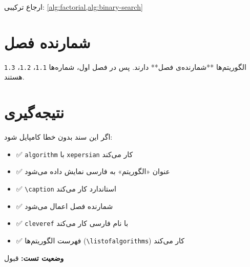 ارجاع ترکیبی: \cref{alg:factorial,alg:binary-search}

\section{شمارنده فصل}
\label{sec:chapter-counter}

الگوریتم‌ها **شمارنده‌ی فصل** دارند. پس در فصل اول، شماره‌ها \texttt{1.1}، \texttt{1.2}، \texttt{1.3} هستند.

\section{نتیجه‌گیری}
\label{sec:conclusion}

اگر این سند بدون خطا کامپایل شود:

\begin{itemize}
    \item ✅ \texttt{algorithm} با \texttt{xepersian} کار می‌کند
    \item ✅ عنوان «الگوریتم» به فارسی نمایش داده می‌شود
    \item ✅ \texttt{\textbackslash caption} استاندارد کار می‌کند
    \item ✅ شمارنده فصل اعمال می‌شود
    \item ✅ \texttt{cleveref} با نام فارسی کار می‌کند
    \item ✅ فهرست الگوریتم‌ها (\texttt{\textbackslash listofalgorithms}) کار می‌کند
\end{itemize}

\textbf{وضعیت تست:} قبول


